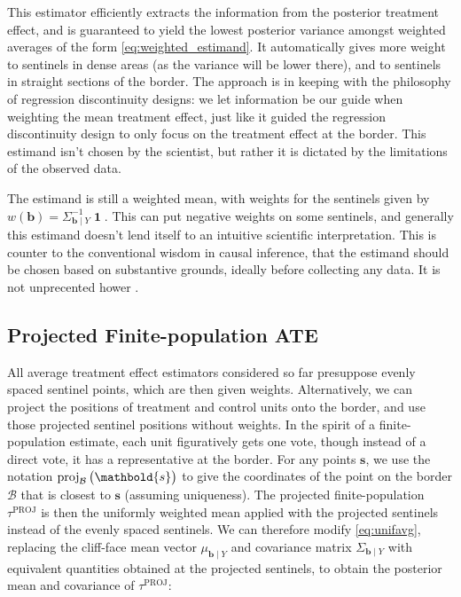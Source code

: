 \documentclass[letter]{article}
\DeclareMathOperator{\ones}{\mathbf{1}}
\newcommand{\svec}{\mathbold{s}}
\newcommand{\boundary}{\mathcal{B}}
\newcommand{\sentinels}{\bm{b}}
\newcommand{\tauproj}{\tau^{\mathrm{PROJ}}}
\DeclareMathOperator{\proj}{proj}
\renewcommand{\cite}[1]{\citep{#1}}
\begin{document}
This estimator efficiently extracts the information from the posterior treatment effect, and is guaranteed to yield the lowest posterior variance amongst weighted averages of the form \eqref{eq:weighted_estimand}.
It automatically gives more weight to sentinels in dense areas (as the variance will be lower there), and to sentinels in straight sections of the border.
The approach is in keeping with the philosophy of regression discontinuity designs: we let information be our guide when weighting the mean treatment effect, just like it guided the regression discontinuity design to only focus on the treatment effect at the border.
This estimand isn't chosen by the scientist, but rather it is dictated by the limitations of the observed data.

The estimand is still a weighted mean, with weights for the sentinels given by \(w(\sentinels) = \Sigma_{\sentinels \mid Y}^{-1} \ones\).
This can put negative weights on some sentinels, and generally this estimand doesn't lend itself to an intuitive scientific interpretation.
This is counter to the conventional wisdom in causal inference, that the estimand should be chosen based on substantive grounds, ideally before collecting any data.
It is not unprecented hower \cite{li2016balancing}.
    


    	\subsection{Projected Finite-population ATE}\label{projected-finite-population-ate}

All average treatment effect estimators considered so far presuppose evenly spaced sentinel points, which are then given weights.
Alternatively, we can project the positions of treatment and control units onto the border, and use those projected sentinel positions without weights.
In the spirit of a finite-population estimate, each unit figuratively gets one vote, though instead of a direct vote, it has a representative at the border.
For any points \(\svec\), we use the notation \(\proj_{\boundary}\del{\svec}\) to give the coordinates of the point on the border \(\boundary\) that is closest to \(\svec\) (assuming uniqueness).
The projected finite-population \(\tauproj\) is then the uniformly weighted mean applied with the projected sentinels instead of the evenly spaced sentinels.
We can therefore modify \eqref{eq:unifavg}, replacing the cliff-face mean vector \(\mu_{\sentinels \mid Y}\)
and covariance matrix \(\Sigma_{\sentinels \mid Y}\)
with equivalent quantities obtained at the projected sentinels,
to obtain the posterior mean and covariance of \(\tauproj\):
\end{document}
